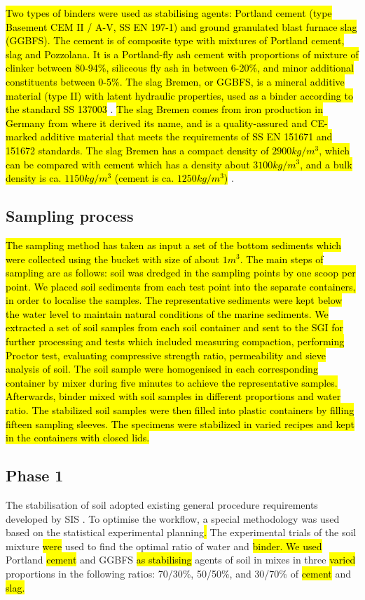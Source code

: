 \documentclass{amestyle}
\begin{document}
\hl{Two types of binders were used as stabilising agents: Portland cement (type Basement CEM II / A-V, SS EN 197-1) and ground granulated blast furnace slag (GGBFS). The cement is of composite type with mixtures of Portland cement, slag and Pozzolana. It is a Portland-fly ash cement with proportions of mixture of clinker between 80-94\%, siliceous fly ash in between 6-20\%, and minor additional constituents between 0-5\%. The slag Bremen, or GGBFS, is a mineral additive material (type II) with latent hydraulic properties, used as a binder according to the standard SS 137003} \cite{BSI}. \hl{The slag Bremen comes from iron production in Germany from where it derived its name, and is a quality-assured and CE-marked additive material that meets the requirements of SS EN 151671 and 151672 standards. The slag Bremen has a compact density of $2900 kg/m^3$, which can be compared with cement which has a density about $3100 kg/m^3$, and a bulk density is ca. $1150 kg/m^3$ (cement is ca. $1250 kg/m^3$)} \cite{ThomasCement}. 

\subsection{Sampling process}
\hl{The sampling method has taken as input a set of the bottom sediments which were collected using the bucket with size of about $1 m^3$. The main steps of sampling are as follows: soil was dredged in the sampling points by one scoop per point. We placed soil sediments from each test point into the separate containers, in order to localise the samples. The representative sediments were kept below the water level to maintain natural conditions of the marine sediments. We extracted a set of soil samples from each soil container and sent to the SGI for further processing and tests which included measuring compaction, performing Proctor test, evaluating compressive strength ratio, permeability and sieve analysis of soil. The soil sample were homogenised in each corresponding container by mixer during five minutes to achieve the representative samples. Afterwards, binder mixed with soil samples in different proportions and water ratio. The stabilized soil samples were then filled into plastic containers by filling fifteen sampling sleeves. The specimens were stabilized in varied recipes and kept in the containers with closed lids.}

\subsection{Phase 1}
The stabilisation of soil adopted existing general procedure requirements developed by SIS \cite{SIS2018}. To optimise the workflow, a special methodology was used based on the statistical experimental planning\hl{. }The experimental trials of the soil mixture \hl{were} used to find the optimal ratio of water and \hl{binder. We used} Portland \hl{cement} and GGBFS \hl{as stabilising} agents of soil in mixes in three \hl{varied} proportions in the following ratios: 70/30\%, 50/50\%, and 30/70\% of \hl{cement} and \hl{slag.} 
\end{document}
